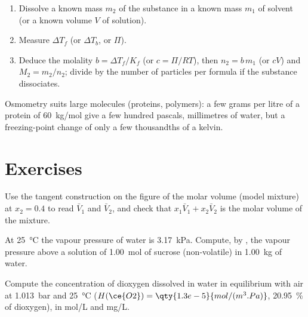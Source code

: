 \begin{method}\label{met:b2:chemical-potential:molar-mass}
\begin{enumerate}
  \item Dissolve a known mass $m_2$ of the substance in a known mass $m_1$
        of solvent (or a known volume $V$ of solution).
  \item Measure $\Delta T_f$ (or $\Delta T_b$, or $\Pi$).
  \item Deduce the molality $b = \Delta T_f/K_f$ (or $c = \Pi/RT$), then $n_2 =
        b\,m_1$ (or $cV$) and $M_2 = m_2/n_2$; divide by the number of
        particles per formula if the substance dissociates.
\end{enumerate}
Osmometry suits large molecules (proteins, polymers): a few grams per litre
of a protein of \qty{60}{kg/mol} give a few hundred pascals, millimetres of
water, but a freezing-point change of only a few thousandths of a kelvin.
\end{method}

\section{Exercises}

\begin{exercise}[$\star$]\label{exo:b2:chemical-potential:1}
Use the tangent construction on the figure of the molar volume (model
mixture) at $x_2 = 0.4$ to read $\bar V_1$ and $\bar V_2$, and check that
$x_1\bar V_1 + x_2\bar V_2$ is the molar volume of the mixture.
\end{exercise}

\begin{exercise}[$\star$]\label{exo:b2:chemical-potential:2}
At \qty{25}{\celsius} the vapour pressure of water is \qty{3.17}{kPa}.
Compute, by , the vapour pressure above a solution of
\qty{1.00}{mol} of sucrose (non-volatile) in \qty{1.00}{kg} of water.
\end{exercise}

\begin{exercise}[$\star$]\label{exo:b2:chemical-potential:3}
Compute the concentration of dioxygen dissolved in water in equilibrium with
air at \qty{1.013}{bar} and \qty{25}{\celsius} ($H(\ce{O2}) =
\qty{1.3e-5}{mol/(m^3.Pa)}$, \qty{20.95}{\percent} of dioxygen), in
\unit{mol/L} and \unit{mg/L}.
\end{exercise}

